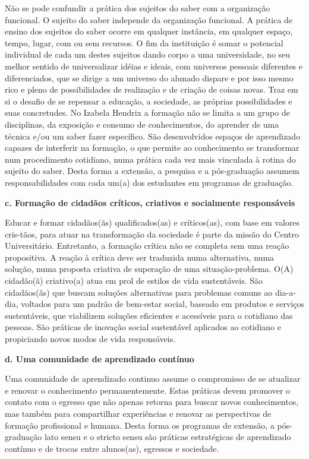 \documentclass[a4paper, 12pt, openright, oneside, german, french, english, brazil]{abntex2}
\begin{document}
Não se pode confundir a prática dos sujeitos do saber com a organização funcional. O sujeito do saber independe da organização funcional. A prática de ensino dos sujeitos do saber ocorre em qualquer instância, em qualquer espaço, tempo, lugar, com ou sem recursos. O fim da instituição é somar o potencial individual de cada um destes sujeitos dando corpo a uma universidade, no seu melhor sentido de universalizar idéias e ideais, com universos pessoais diferentes e diferenciados, que se dirige a um universo do alunado dispare e por isso mesmo rico e pleno de possibilidades de realização e de criação de coisas novas. Traz em si o desafio de se repensar a educação, a sociedade, as próprias possibilidades e suas concretudes. No Izabela Hendrix a formação não se limita a um grupo de disciplinas, da exposição e consumo de conhecimentos, do aprender de uma técnica e/ou um saber fazer específico. São desenvolvidos espaços de aprendizado capazes de interferir na formação, o que permite ao conhecimento se transformar num procedimento cotidiano, numa prática cada vez mais vinculada à rotina do sujeito do saber. Desta forma a extensão, a pesquisa e a pós-graduação assumem responsabilidades com cada um(a) dos estudantes em programas de graduação.

\vspace{5mm}

\textbf{c. Formação de cidadãos críticos, criativos e socialmente responsáveis}

Educar e formar cidadãos(ãs) qualificados(as) e críticos(as), com base em valores cris-tãos, para atuar na transformação da sociedade é parte da missão do Centro Universitário. Entretanto, a formação crítica não se completa sem uma reação propositiva. A reação à crítica deve ser traduzida numa alternativa, numa solução, numa proposta criativa de superação de uma situação-problema. O(A) cidadão(ã) criativo(a) atua em prol de estilos de vida sustentáveis. São cidadãos(ãs) que buscam soluções alternativas para problemas comuns ao dia-a-dia, voltados para um padrão de bem-estar social, baseado em produtos e serviços sustentáveis, que viabilizem soluções eficientes e acessíveis para o cotidiano das pessoas. São práticas de inovação social sustentável aplicados ao cotidiano e propiciando novos modos de vida responsáveis.

\vspace{5mm}

\textbf{d. Uma comunidade de aprendizado contínuo}

Uma comunidade de aprendizado continuo assume o compromisso de se atualizar e renovar o conhecimento permanentemente. Estas práticas devem promover o contato com o egresso que não apenas retorna para buscar novos conhecimentos, mas também para compartilhar experiências e renovar as perspectivas de formação profissional e humana. Desta forma os programas de extensão, a pós-graduação lato sensu e o stricto sensu são práticas estratégicas de aprendizado contínuo e de trocas entre alunos(as), egressos e sociedade.
\end{document}
